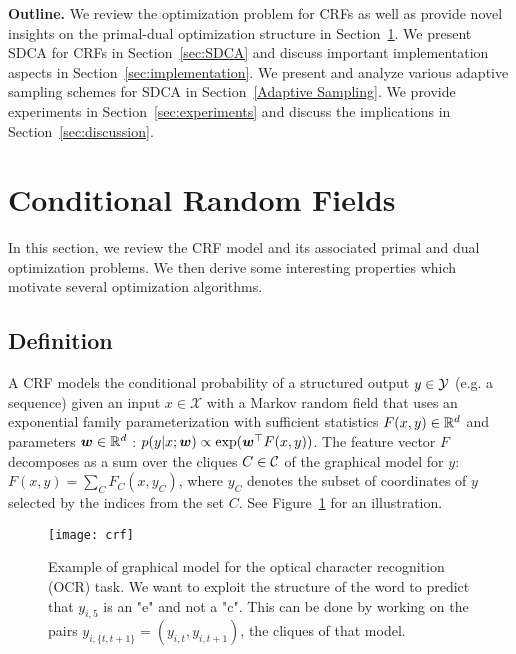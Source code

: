 \textbf{Outline.}
We review the optimization problem for CRFs as well as provide novel insights on the primal-dual optimization structure in Section~\ref{sec:CRF}.
We present SDCA for CRFs in Section~\ref{sec:SDCA} and discuss important implementation aspects in Section~\ref{sec:implementation}.
We present and analyze various adaptive sampling schemes for SDCA in Section~\ref{Adaptive Sampling}.
We provide experiments in Section~\ref{sec:experiments} and discuss the implications in Section~\ref{sec:discussion}.


\section{Conditional Random Fields} \label{sec:CRF}
In this section, we review the CRF model and its associated primal and dual optimization problems.
We then derive some interesting properties which motivate several optimization algorithms.

\subsection{Definition}
A CRF models the conditional probability of a structured output $y \in {\mathcal Y}$ (e.g. a sequence) given an input $x\in \mathcal X$ with a Markov random field that uses an exponential family parameterization with sufficient statistics $F(x,y) \in \mathbb{R}^d$ and parameters $\boldsymbol{w} \in \mathbb{R}^d$ : $p(y | x ; \boldsymbol{w}) \propto \exp(\boldsymbol{w}^{\top}F(x, y))$. The feature vector $F$ decomposes as a sum over the cliques $C \in {\mathcal C}$ of the graphical model for $y$: $F(x, y) = \sum_C F_C(x, y_C)$, where $y_C$ denotes the subset of coordinates of $y$ selected by the indices from the set $C$. See Figure~\ref{crf example} for an illustration.


\begin{figure}
	\centering 
	\texttt{[image: crf]}
	\caption[Example of graphical model for the optical character recognition (OCR) task]{
		Example of graphical model for the optical character recognition (OCR) task.
		We want to exploit the structure of the word to predict that $y_{i,5}$ is an "e" and not a "c".
		This can be done by working on the pairs $y_{i,\{t, t+1\} } = (y_{i, t}, y_{i, t+1})$, the cliques of that model.
		}
		\label{crf example}
\end{figure}

